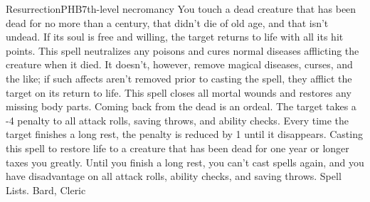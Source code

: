 \begin{spell}{Resurrection}{PHB}{7th-level necromancy}
{
}
You touch a dead creature that has been dead for no more than a century, that didn’t die of old age, and that isn’t undead. If its soul is free and willing, the target returns to life with all its hit points.
This spell neutralizes any poisons and cures normal diseases afflicting the creature when it died. It doesn’t, however, remove magical diseases, curses, and the like; if such affects aren’t removed prior to casting the spell, they afflict the target on its return to life.
This spell closes all mortal wounds and restores any missing body parts.
Coming back from the dead is an ordeal. The target takes a -4 penalty to all attack rolls, saving throws, and ability checks. Every time the target finishes a long rest, the penalty is reduced by 1 until it disappears.
Casting this spell to restore life to a creature that has been dead for one year or longer taxes you greatly. Until you finish a long rest, you can’t cast spells again, and you have disadvantage on all attack rolls, ability checks, and saving throws.
Spell Lists. Bard, Cleric
\end{spell}

